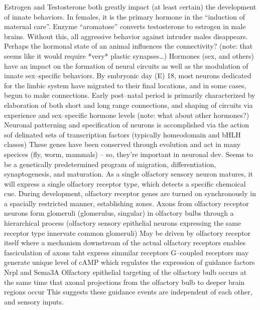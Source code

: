 \documentclass[11pt, a4paper, oneside]{article}   	%
\begin{document}
\begin{outline}
  \point Estrogen and Testosterone both greatly impact (at least certain) the development of innate behaviors. In females, it is the primary hormone in the ``induction of maternal care''.
    \subpoint Enzyme ``aromatose'' converts testosterone to estrogen in male brains. Without this, all aggressive behavior against intruder males disappears.
        \subsubpoint Perhaps the hormonal state of an animal influences the connectivity? (note: that seems like it would require *very* plastic synapses\ldots)
  \point Hormones (sex, and others) have an impact on the formation of neural circuits as well as the modulation of innate sex--specific behaviors.
  \point By embryonic day (E) 18, most neurons dedicated for the limbic system have migrated to their final locations, and in some cases, begun to make connections.
    \subpoint Early post--natal period is primarily characterized by elaboration of both short and long range connections, and shaping of circuits via experience and sex--specific hormone levels (note: what about other hormones?)
    \point Neuronal patterning and specification of neurons is accomplished via the action sof delinated sets of transcription factors (typically homeodomain and bHLH classes)
        \subpoint These genes have been conserved through evolution and act in many specices (fly, worm, mammals) -- so, they're important in neuronal dev.
  \point Seems to be a genetically predetermined program of migration, differentiation, synaptogenesis, and maturation.
  \point As a single olfactory sensory neuron matures, it will express a single olfactory receptor type, which detects a specific chemoical cue.
    \subpoint During development, olfactory receptor genes are turned on synchronously in a spacially restricted manner, establishing zones.
  \point Axons from olfactory receptor neurons form glomeruli (glomerulus, singular) in olfactory bulbs through a hierarchical process (olfactory sensory epithelial neurons expressing the same receptor type innervate common glomeruli)
    \subpoint May be driven by olfactory receptor itself where a mechanism downstream of the actual olfactory receptors enables fasciculation of axons taht express simmilar receptors
        \subsubpoint G--coupled receptors may generate  unique level of cAMP which regulates the expression of guidance factors Nrpl and Sema3A
  \point Olfactory epithelial targeting of the olfactory bulb occurs at the same time that axonal projections from the olfactory bulb to deeper brain regions occur
    \subpoint This suggests these guidance events are independent of each other, and sensory inputs.

\end{outline}
\end{document}
